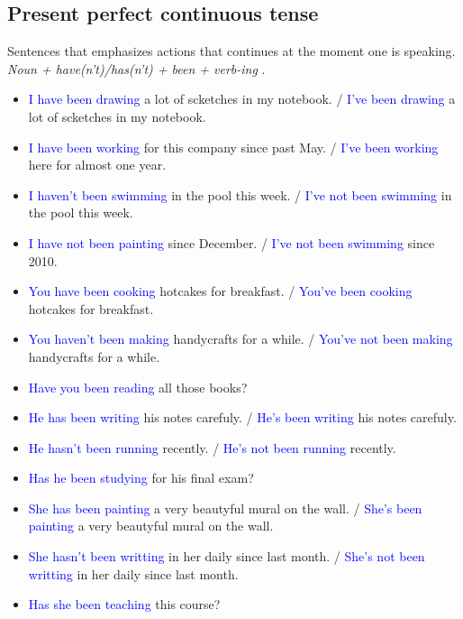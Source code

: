\subsection{Present perfect continuous tense}
\begin{multicols}{2}
Sentences that emphasizes actions that continues at the moment one is speaking.\\
\emph{Noun + have(n't)/has(n't) + been + verb-ing }.\\

\begin{itemize}
\item \textcolor{blue}{I have been drawing} a lot of scketches in my notebook. / \textcolor{blue}{I've been drawing} a lot of scketches in my notebook.
\item \textcolor{blue}{I have been working} for this company since past May. / \textcolor{blue}{I've been working} here for almost one year.
\item \textcolor{blue}{I haven't been swimming} in the pool this week. / \textcolor{blue}{I've not been swimming} in the pool this week.
\item \textcolor{blue}{I have not been painting} since December. / \textcolor{blue}{I've not been swimming} since 2010.

\item \textcolor{blue}{You have been cooking} hotcakes for breakfast. / \textcolor{blue}{You've been cooking} hotcakes for breakfast.
\item \textcolor{blue}{You haven't been making} handycrafts for a while. / \textcolor{blue}{You've not been making} handycrafts for a while.
\item \textcolor{blue}{Have you been reading} all those books?

\item \textcolor{blue}{He has been writing} his notes carefuly. / \textcolor{blue}{He's been writing} his notes carefuly.
\item \textcolor{blue}{He hasn't been running} recently. / \textcolor{blue}{He's not been running} recently.
\item \textcolor{blue}{Has he been studying} for his final exam?

\item \textcolor{blue}{She has been painting} a very beautyful mural on the wall. / \textcolor{blue}{She's been painting} a very beautyful mural on the wall.
\item \textcolor{blue}{She hasn't been writting} in her daily since last month. / \textcolor{blue}{She's not been writting} in her daily since last month.
\item \textcolor{blue}{Has she been teaching} this course?


\end{itemize}
\end{multicols}
